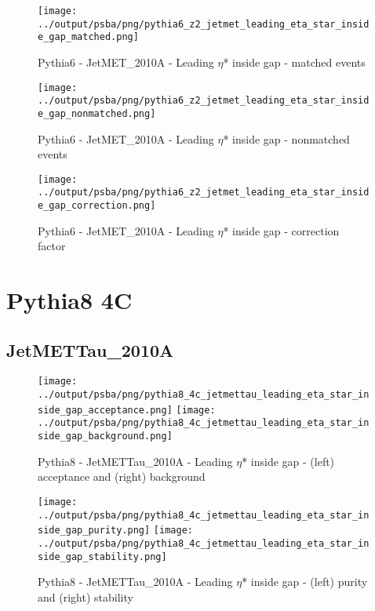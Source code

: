 \documentclass[11pt]{book}
\begin{document}
\begin{figure}[ht]
\centering
\texttt{[image: ../output/psba/png/pythia6\_z2\_jetmet\_leading\_eta\_star\_inside\_gap\_matched.png]}
\caption{Pythia6 - JetMET\_2010A - Leading $\eta$* inside gap - matched events}
\label{fig:p6_jetmet_leading_eta_star_inside_gap_matched}
\end{figure}

\begin{figure}[ht]
\centering
\texttt{[image: ../output/psba/png/pythia6\_z2\_jetmet\_leading\_eta\_star\_inside\_gap\_nonmatched.png]}
\caption{Pythia6 - JetMET\_2010A - Leading $\eta$* inside gap - nonmatched events}
\label{fig:p6_jetmet_leading_eta_star_inside_gap_nonmatched}
\end{figure}

\begin{figure}[ht]
\centering
\texttt{[image: ../output/psba/png/pythia6\_z2\_jetmet\_leading\_eta\_star\_inside\_gap\_correction.png]}
\caption{Pythia6 - JetMET\_2010A - Leading $\eta$* inside gap - correction factor}
\label{fig:p6_jetmet_leading_eta_star_inside_gap_correction}
\end{figure}



\clearpage
\section{Pythia8 4C}
\subsection{JetMETTau\_2010A}

\begin{figure}[ht]
\centering
\texttt{[image: ../output/psba/png/pythia8\_4c\_jetmettau\_leading\_eta\_star\_inside\_gap\_acceptance.png]}
\texttt{[image: ../output/psba/png/pythia8\_4c\_jetmettau\_leading\_eta\_star\_inside\_gap\_background.png]}
\caption{Pythia8 - JetMETTau\_2010A - Leading $\eta$* inside gap - (left) acceptance and (right) background}
\label{fig:p8_jetmettau_leading_eta_star_inside_gap_ab}
\end{figure}

\begin{figure}[ht]
\centering
\texttt{[image: ../output/psba/png/pythia8\_4c\_jetmettau\_leading\_eta\_star\_inside\_gap\_purity.png]}
\texttt{[image: ../output/psba/png/pythia8\_4c\_jetmettau\_leading\_eta\_star\_inside\_gap\_stability.png]}
\caption{Pythia8 - JetMETTau\_2010A - Leading $\eta$* inside gap - (left) purity and (right) stability}
\label{fig:p8_jetmettau_leading_eta_star_inside_gap_ps}
\end{figure}
\end{document}

